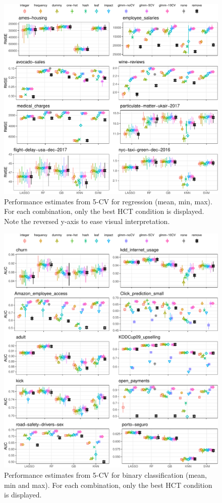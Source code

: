 \documentclass[smallextended]{svjour3}       %
\begin{document}
\begin{figure}[!h]
\includegraphics[width=\textwidth]{regr-res-1} \caption{Performance estimates from 5-CV for regression (mean, min, max). For each combination, only the best HCT condition is displayed. Note the reversed y-axis to ease visual interpretation.}\label{fig:regr-res}
\end{figure}



\begin{figure}[!h]
\includegraphics[width=\textwidth]{bincl-res-1} \caption{Performance estimates from 5-CV for binary classification (mean, min and max). For each combination, only the best HCT condition is displayed.}\label{fig:bincl-res}
\end{figure}
\end{document}
